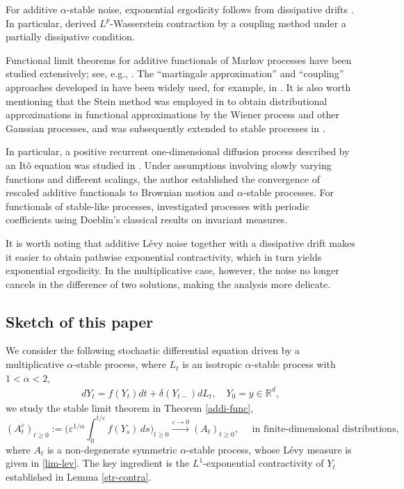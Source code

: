 \documentclass[11pt,reqno]{amsart}
\numberwithin{equation}{section}
\begin{document}
For additive $\alpha$-stable noise, exponential ergodicity follows from dissipative drifts \cite{MBM,SXX,JW}. In particular, \cite{JW2} derived $L^p$-Wasserstein contraction by a coupling method under a partially dissipative condition.

Functional limit theorems for additive functionals of Markov processes have been studied extensively; see, e.g., \cite{BWY,XC,KV,AS}. The ``martingale approximation'' and ``coupling'' approaches developed in \cite{JKO,PSV} have been widely used, for example, in \cite{GP,MI}.
It is also worth mentioning that the Stein method was employed in \cite{ADB} to obtain distributional approximations in functional approximations by the Wiener process and other Gaussian processes, and
was subsequently extended to stable processes in \cite{X2,X1}.

In particular, a positive recurrent one-dimensional diffusion process described by an It\^o equation was studied in \cite{LB}. Under assumptions
involving slowly varying functions and different scalings, the author established the convergence of rescaled additive functionals to Brownian motion and $\alpha$-stable processes. For functionals of stable-like
processes, \cite{BF} investigated processes with periodic coefficients
using Doeblin's classical results on invariant measures.

It is worth noting that additive L\'evy noise together with a dissipative drift makes it easier to obtain pathwise exponential contractivity, which in turn yields exponential ergodicity. In the multiplicative case,
however, the noise no longer cancels in the difference of two solutions, making the analysis more delicate.
  




\subsection{Sketch of this paper}

We consider the following stochastic differential equation driven by a multiplicative $\alpha$-stable process, where  $L_{t}$ is an isotropic  $\alpha$-stable process with $1<\alpha<2$,
\begin{align}\label{multca}
	dY_{t}=f(Y_{t})dt+\delta(Y_{t-})dL_{t},\quad
	Y_{0}=y\in \mathbb{R}^{d },
\end{align}	
we study the stable limit theorem in Theorem \ref{addi-func},  	$$
	(A_t^\varepsilon)_{t\geq0}:=\bigg(\varepsilon^{1/\alpha}
\int_0^{t/\varepsilon}f(Y_s)\,ds\bigg)_{t\geq0} \xrightarrow{\varepsilon\to0}  (A_t)_{t\geq0}, \quad   \text{ in finite-dimensional distributions,}
$$
where $A_t$ is a non-degenerate symmetric $\alpha$-stable process, whose L\'evy measure is given in \eqref{lim-lev}. The key ingredient is the $L^1$-exponential contractivity of $Y_t$ established in Lemma \ref{str-contra}.
\end{document}
